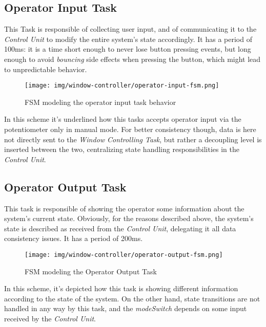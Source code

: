 \documentclass[a4paper,12pt]{report}
\begin{document}
		\subsection{Operator Input Task}
		This Task is responsible of collecting user input, and of communicating it to the \textit{Control Unit} to modify the entire system's state accordingly. It has a period of 100ms: it is a time short enough to never lose button pressing events, but long enough to avoid \textit{bouncing} side effects when pressing the button, which might lead to unpredictable behavior.
		\begin{figure}[H]
			\centering{}
			\texttt{[image: img/window-controller/operator-input-fsm.png]}
			\caption{FSM modeling the operator input task behavior}
			\label{img:window-controller/operator-input-fsm}
		\end{figure}
		In this scheme it's underlined how this tasks accepts operator input via the potentiometer only in manual mode. For better consistency though, data is here not directly sent to the \textit{Window Controlling Task}, but rather a decoupling level is inserted between the two, centralizing state handling responsibilities in the \textit{Control Unit}.
		\subsection{Operator Output Task}
		This task is responsible of showing the operator some information about the system's current state. Obviously, for the reasons described above, the system's state is described as received from the \textit{Control Unit}, delegating it all data consistency issues. It has a period of 200ms.
		\begin{figure}[H]
			\centering{}
			\texttt{[image: img/window-controller/operator-output-fsm.png]}
			\caption{FSM modeling the Operator Output Task}
			\label{img:window-controller/operator-output-fsm}
		\end{figure}
		In this scheme, it's depicted how this task is showing different information according to the state of the system. On the other hand, state transitions are not handled in any way by this task, and the \textit{modeSwitch} depends on some input received by the \textit{Control Unit}.
\end{document}
